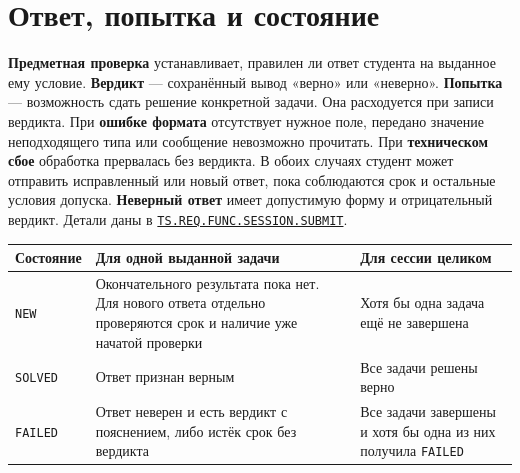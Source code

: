 \documentclass[12pt,a4paper]{article}
\begin{document}
\section{Ответ, попытка и состояние}\label{ux43eux442ux432ux435ux442-ux43fux43eux43fux44bux442ux43aux430-ux438-ux441ux43eux441ux442ux43eux44fux43dux438ux435}

\hypertarget{ответ-попытка-и-состояние}{}

\textbf{Предметная проверка} устанавливает, правилен ли ответ студента на выданное ему условие. \textbf{Вердикт} --- сохранённый вывод «верно» или «неверно». \textbf{Попытка} --- возможность сдать решение конкретной задачи. Она расходуется при записи вердикта. При \textbf{ошибке формата} отсутствует нужное поле, передано значение неподходящего типа или сообщение невозможно прочитать. При \textbf{техническом сбое} обработка прервалась без вердикта. В обоих случаях студент может отправить исправленный или новый ответ, пока соблюдаются срок и остальные условия допуска. \textbf{Неверный ответ} имеет допустимую форму и отрицательный вердикт. Детали даны в {\href{../02\_Техническое\_задание/DOC-02\_Техническое\_задание.pdf\#ts-req-func-session-submit}{\texttt{TS.\allowbreak{}REQ.\allowbreak{}FUNC.\allowbreak{}SESSION.\allowbreak{}SUBMIT}}}.

{\def\LTcaptype{none} %
\begin{longtable}[]{@{}
  >{\raggedright\arraybackslash}p{}
  >{\raggedright\arraybackslash}p{}
  >{\raggedright\arraybackslash}p{}@{}}
\toprule\noalign{}
\begin{minipage}[b]{\linewidth}\raggedright
Состояние
\end{minipage} & \begin{minipage}[b]{\linewidth}\raggedright
Для одной выданной задачи
\end{minipage} & \begin{minipage}[b]{\linewidth}\raggedright
Для сессии целиком
\end{minipage} \\
\midrule\noalign{}
\endhead
\bottomrule\noalign{}
\endlastfoot
\texttt{NEW} & Окончательного результата пока нет. Для нового ответа отдельно проверяются срок и наличие уже начатой проверки & Хотя бы одна задача ещё не завершена \\
\texttt{SOLVED} & Ответ признан верным & Все задачи решены верно \\
\texttt{FAILED} & Ответ неверен и есть вердикт с пояснением, либо истёк срок без вердикта & Все задачи завершены и хотя бы одна из них получила \texttt{FAILED} \\
\end{longtable}
}
\end{document}
